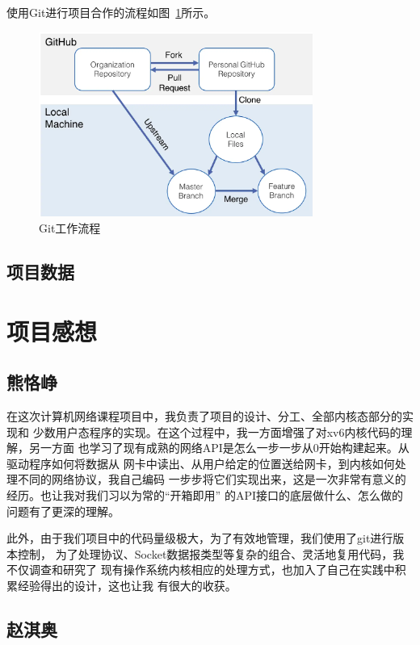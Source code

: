 \documentclass[a4paper,twoside]{ctexrep}
\begin{document}
\begin{spacing}{1.2}
使用Git进行项目合作的流程如图~\ref{fig:gitflow}所示。
\begin{figure}[htb]
	\centering
	\caption{Git工作流程}
	\label{fig:gitflow}
	\includegraphics[width=0.8\textwidth]{git.png}
\end{figure}

\section{项目数据}
 

\chapter{项目感想}

\section{熊恪峥}

在这次计算机网络课程项目中，我负责了项目的设计、分工、全部内核态部分的实现和
少数用户态程序的实现。在这个过程中，我一方面增强了对xv6内核代码的理解，另一方面
也学习了现有成熟的网络API是怎么一步一步从0开始构建起来。从驱动程序如何将数据从
网卡中读出、从用户给定的位置送给网卡，到内核如何处理不同的网络协议，我自己编码
一步步将它们实现出来，这是一次非常有意义的经历。也让我对我们习以为常的“开箱即用”
的API接口的底层做什么、怎么做的问题有了更深的理解。

此外，由于我们项目中的代码量级极大，为了有效地管理，我们使用了git进行版本控制，
为了处理协议、Socket数据报类型等复杂的组合、灵活地复用代码，我不仅调查和研究了
现有操作系统内核相应的处理方式，也加入了自己在实践中积累经验得出的设计，这也让我
有很大的收获。

\section{赵淇奥}


\end{spacing}
\end{document}
